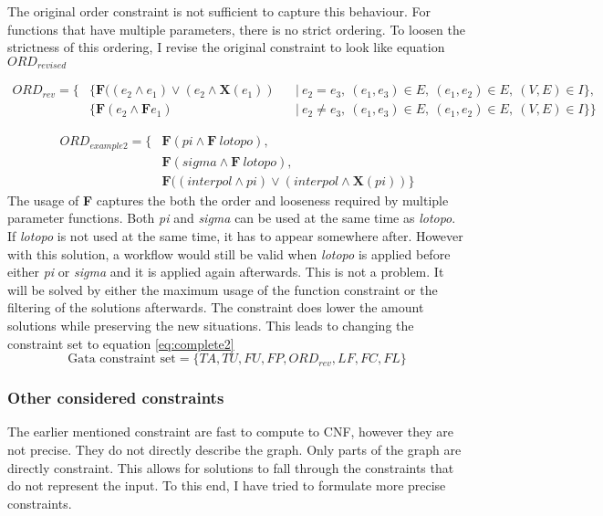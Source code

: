 \documentclass{article}
\begin{document}
The original order constraint is not sufficient to capture this behaviour. For functions that have multiple parameters, there is no strict ordering. To loosen the strictness of this ordering, I revise the original constraint to look like equation $ORD_{revised}$

\begin{align*}
        ORD_{rev} =\{& \{\textbf{F}((e_2 \wedge e_1) \vee (e_2 \wedge \textbf{X} (e_1)  )&  &|\ e_2 = e_3,\ (e_1,e_3) \in  E ,\ (e_1,e_2) \in  E ,\ (V,E) \in  I  \}, \\
        &\{\textbf{F}(e_2 \wedge \textbf{F} e_1) &  &|\ e_2 \not= e_3,\ (e_1,e_3) \in  E ,\ (e_1,e_2) \in  E,\    (V,E) \in I\}\}
\end{align*}

\begin{align*}
    ORD_{example2} = \{& \textbf{F}(pi \wedge \textbf{F}\ lotopo), \\
    & \textbf{F}(sigma \wedge \textbf{F}\ lotopo), \\
    &\textbf{F}((interpol \wedge pi) \vee (interpol \wedge \textbf{X} (pi)  ) 
    \}
\end{align*}
The usage of \textbf{F} captures the both the order and looseness required by multiple parameter functions. Both \textit{pi} and \textit{sigma} can be used at the same time as \textit{lotopo}. If \textit{lotopo} is not used at the same time, it has to appear somewhere after. However with this solution, a workflow would still be valid when \textit{lotopo} is applied before either \textit{pi} or \textit{sigma} and it is applied again afterwards. This is not a problem. It will be solved by either the maximum usage of the function constraint or the filtering of the solutions afterwards. The constraint does lower the amount solutions while preserving the new situations. This leads to changing the constraint set to equation \ref{eq:complete2}
\begin{equation}
 \text{Gata constraint set}= \{TA, TU, FU, FP, ORD_{rev}, LF, FC,FL\} \label{eq:complete2}
\end{equation}
 
 




\subsubsection{Other considered constraints}
The earlier mentioned constraint are fast to compute to CNF, however they are not precise. They do not directly describe the graph. Only parts of the graph are directly constraint. This allows for solutions to fall through the constraints that do not represent the input. To this end, I have tried to formulate more precise constraints. \\
\end{document}
